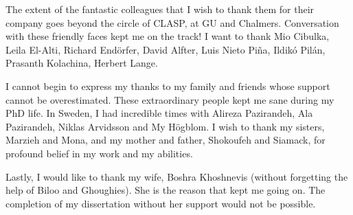 The extent of the fantastic colleagues that I wish to thank them for their company goes beyond the circle of CLASP, at GU and Chalmers. Conversation with these friendly faces kept me on the track! I want to thank Mio Cibulka, Leila El-Alti, Richard Endörfer, David Alfter, Luis Nieto Piña, Ildikó Pilán, Prasanth Kolachina, Herbert Lange.  

I cannot begin to express my thanks to my family and friends whose support cannot be overestimated. These extraordinary people kept me sane during my PhD life. In Sweden, I had incredible times with Alireza Pazirandeh, Ala Pazirandeh, Niklas Arvidsson and My Högblom. 
I wish to thank my sisters, Marzieh and Mona, and my mother and father, Shokoufeh and Siamack, for profound belief in my work and my abilities. 

Lastly, I would like to thank my wife, Boshra Khoshnevis (without forgetting the help of Biloo and Ghoughies). She is the reason that kept me going on. The completion of my dissertation without her support would not be possible.



